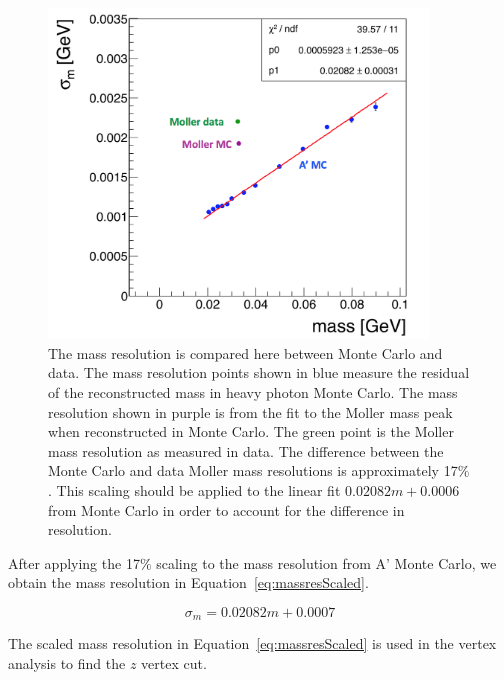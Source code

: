 \begin{figure}[H]
  \centering
      \includegraphics[width=0.9\textwidth]{pics/searching/massResolution.png}
  \caption[Mass resolution compared between Monte Carlo and data]{The mass resolution is compared here between Monte Carlo and data. The mass resolution points shown in blue measure the residual of the reconstructed mass in heavy photon Monte Carlo. The mass resolution shown in purple is from the fit to the Moller mass peak when reconstructed in Monte Carlo. The green point is the Moller mass resolution as measured in data. The difference between the Monte Carlo and data Moller mass resolutions is approximately 17$\%$. This scaling should be applied to the linear fit $0.02082m+0.0006$ from Monte Carlo in order to account for the difference in resolution.}
  \label{fig:massRes}
\end{figure} 

After applying the 17$\%$ scaling to the mass resolution from A' Monte Carlo, we obtain the mass resolution in Equation~\eqref{eq:massresScaled}.

\begin{equation}
\label{eq:massresScaled}
\sigma_m = 0.02082m+0.0007
\end{equation}

The scaled mass resolution in Equation~\eqref{eq:massresScaled} is used in the vertex analysis to find the $z$ vertex cut. 



